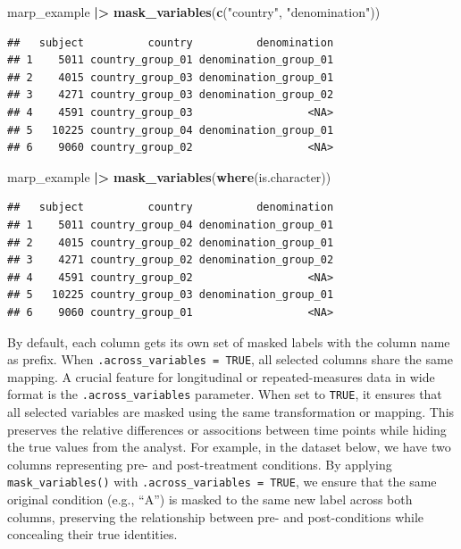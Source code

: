 \documentclass[
  english,
  man,floatsintext]{apa6}
\newenvironment{Shaded}{\begin{snugshade}}{\end{snugshade}}
\newcommand{\FunctionTok}[1]{\textcolor[rgb]{0.13,0.29,0.53}{\textbf{#1}}}
\newcommand{\NormalTok}[1]{#1}
\newcommand{\SpecialCharTok}[1]{\textcolor[rgb]{0.81,0.36,0.00}{\textbf{#1}}}
\newcommand{\StringTok}[1]{\textcolor[rgb]{0.31,0.60,0.02}{#1}}
\begin{document}
\begin{Shaded}
\begin{Highlighting}[]
\NormalTok{marp\_example }\SpecialCharTok{|\textgreater{}} 
    \FunctionTok{mask\_variables}\NormalTok{(}\FunctionTok{c}\NormalTok{(}\StringTok{"country"}\NormalTok{, }\StringTok{"denomination"}\NormalTok{))}
\end{Highlighting}
\end{Shaded}

\begin{verbatim}
##   subject          country          denomination
## 1    5011 country_group_01 denomination_group_01
## 2    4015 country_group_03 denomination_group_01
## 3    4271 country_group_03 denomination_group_02
## 4    4591 country_group_03                  <NA>
## 5   10225 country_group_04 denomination_group_01
## 6    9060 country_group_02                  <NA>
\end{verbatim}

\begin{Shaded}
\begin{Highlighting}[]
\NormalTok{marp\_example }\SpecialCharTok{|\textgreater{}} 
    \FunctionTok{mask\_variables}\NormalTok{(}\FunctionTok{where}\NormalTok{(is.character))}
\end{Highlighting}
\end{Shaded}

\begin{verbatim}
##   subject          country          denomination
## 1    5011 country_group_04 denomination_group_01
## 2    4015 country_group_02 denomination_group_01
## 3    4271 country_group_02 denomination_group_02
## 4    4591 country_group_02                  <NA>
## 5   10225 country_group_03 denomination_group_01
## 6    9060 country_group_01                  <NA>
\end{verbatim}

By default, each column gets its own set of masked labels with the column name as prefix. When \texttt{.across\_variables\ =\ TRUE}, all selected columns share the same mapping. A crucial feature for longitudinal or repeated-measures data in wide format is the \texttt{.across\_variables} parameter. When set to \texttt{TRUE}, it ensures that all selected variables are masked using the same transformation or mapping. This preserves the relative differences or associtions between time points while hiding the true values from the analyst. For example, in the dataset below, we have two columns representing pre- and post-treatment conditions. By applying \texttt{mask\_variables()} with \texttt{.across\_variables\ =\ TRUE}, we ensure that the same original condition (e.g., ``A'') is masked to the same new label across both columns, preserving the relationship between pre- and post-conditions while concealing their true identities.
\end{document}
